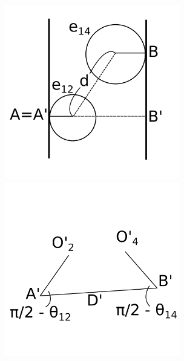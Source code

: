 \documentclass[dvipdfmx]{interact}
\theoremstyle{plain}%
\theoremstyle{definition}
\theoremstyle{remark}
\theoremstyle{problemstyle}
\begin{document}
\begin{figure}[h!tbp]
 \begin{minipage}[t]{0.5\textwidth}
  \centering
  \includegraphics[width=3in, height=3in,
  keepaspectratio]{./img/HexahedraWithSphericalFaces/sideSliceDistance.png}
  \caption{}
  \label{fig:sideSliceDistance}
 \end{minipage}
 \hspace*{\fill}
 \begin{minipage}[t]{0.5\textwidth}
  \centering
  \includegraphics[width=3in, height=3in,
  keepaspectratio]{./img/HexahedraWithSphericalFaces/adb.png}
  \caption{}
  \label{fig:adb}
 \end{minipage}
 \hspace*{\fill}
\end{figure}
\end{document}
